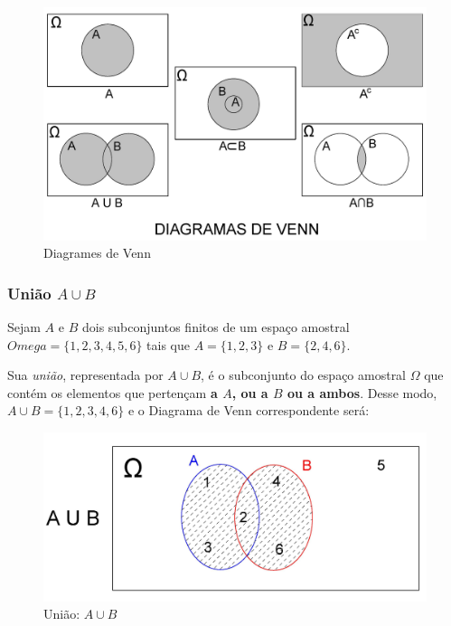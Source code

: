 \documentclass[
]{book}
\begin{document}
\begin{figure}

{\centering \includegraphics[width=0.8\linewidth]{images4/venn} 

}

\caption{Diagrames de Venn}\label{fig:unnamed-chunk-62}
\end{figure}

\hfill\break

\hypertarget{uniuxe3o-a-cup-b}{%
\subsubsection{\texorpdfstring{União \(A \cup B\)}{União A \textbackslash cup B}}\label{uniuxe3o-a-cup-b}}

Sejam \(A\) e \(B\) dois subconjuntos finitos de um espaço amostral \(Omega=\{1,2,3,4,5,6\}\) tais que \(A=\{1,2,3\}\) e \(B=\{2,4,6\}\).

Sua \emph{união}, representada por \(A \cup B\), é o subconjunto do espaço amostral \(\Omega\) que contém os elementos que pertençam \textbf{a \(A\), ou a \(B\) ou a ambos}. Desse modo, \(A \cup B =\{1,2,3,4,6\}\) e o Diagrama de Venn correspondente será:

\hfill\break

\begin{figure}

{\centering \includegraphics[width=0.8\linewidth]{images4/A_UN_B} 

}

\caption{União: $A \cup B$}\label{fig:unnamed-chunk-63}
\end{figure}
\end{document}

